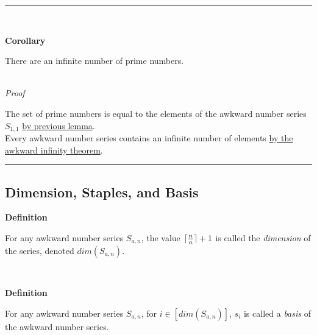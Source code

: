 \documentclass[a4paper,12pt]{article}
\DeclarePairedDelimiter{\ceil}{\lceil}{\rceil}
\begin{document}
\begin{center}
\noindent\rule{8cm}{0.4pt}
\end{center}
\noindent \\



\label{corollary:infinite_primes}
\hypertarget{corollary:infinite_primes}{}
\begin{tcolorbox}
\textbf{Corollary}

There are an infinite number of prime numbers.
\end{tcolorbox}

\noindent \\
\textit{Proof}

\noindent The set of prime numbers is equal to the elements of the awkward number series $S_{1, 1}$ \hyperlink{lemma:prime_asn}{by previous lemma}.\\

\noindent Every awkward number series contains an infinite number of elements \hyperlink{theorem:infinite_asn}{by the awkward infinity theorem}.

\begin{center}
\noindent\rule{8cm}{0.4pt}
\end{center}






\subsection{Dimension, Staples, and Basis}






\label{definition:dimension}
\hypertarget{definition:dimension}{}
\begin{tcolorbox}
\textbf{Definition}

For any awkward number series $S_{a,n}$, the value $\ceil{\frac{n}{a}} + 1$ is called the \textit{dimension} of the series, denoted $dim(S_{a, n})$.

\end{tcolorbox}
\noindent \\







\label{definition:basis}
\hypertarget{definition:basis}{}
\begin{tcolorbox}
\textbf{Definition}

For any awkward number series $S_{a,n}$, for $i \in [dim(S_{a,n})]$, $s_i$ is called a \textit{basis} of the awkward number series.

\end{tcolorbox}
\noindent \\
\end{document}
